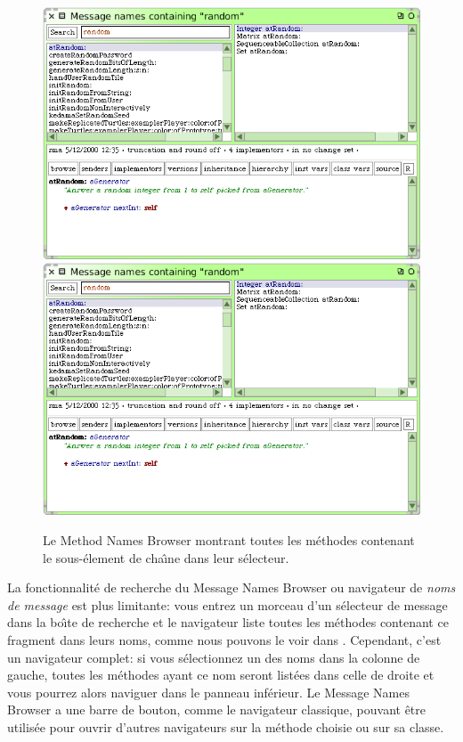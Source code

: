 \documentclass[a4paper,10pt,twoside]{book}
\begin{document}
\begin{figure}[btp]
	\begin{center}
	\ifluluelse
		{\includegraphics[width=\textwidth]{methodNamesRandom}}
		{\includegraphics[scale=0.7]{methodNamesRandom}}
	\end{center}
	\caption{Le Method Names Browser montrant toutes les m\'ethodes contenant le sous-\'element de cha\^{\i}ne  dans leur s\'electeur.}
	\label{fig:methodNamesRandom}
\end{figure}


La fonctionnalit\'e de recherche du Message Names Browser ou navigateur de 
\emph{noms de message} est plus limitante: vous entrez un morceau d'un s\'electeur de 
message dans la bo\^{\i}te de recherche et le navigateur liste toutes les m\'ethodes
contenant ce fragment dans leurs noms, comme nous pouvons le voir dans
.
Cependant, c'est un navigateur complet:
si vous s\'electionnez un des noms dans la colonne de gauche, toutes les m\'ethodes
ayant ce nom seront list\'ees dans celle de droite et vous pourrez alors naviguer dans
le panneau inf\'erieur.
Le Message Names Browser a une barre de bouton, comme le navigateur classique,
pouvant \^etre utilis\'ee pour ouvrir d'autres navigateurs sur la m\'ethode choisie
ou sur sa classe.
\end{document}

